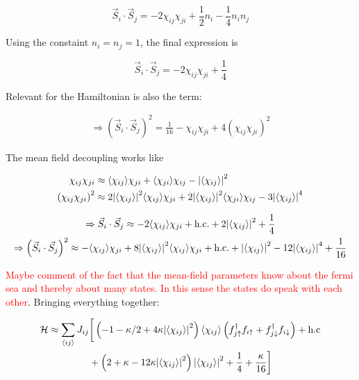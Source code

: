 \documentclass{article}
\begin{document}
\begin{equation}
	\vec{S}_i\cdot \vec{S}_j = -2\chi_{ij}\chi_{ji} + \frac12 n_i -\frac14 n_i n_j
\end{equation}

Using the constaint $n_i = n_j = 1$, the final expression is 

\begin{equation}
	\vec{S}_i\cdot \vec{S}_j = -2\chi_{ij}\chi_{ji} + \frac14
\end{equation}

Relevant for the Hamiltonian is also the term:

\begin{gather}
	\Rightarrow \left( \vec{S}_i \cdot \vec{S}_j \right)^2 =  \frac{1}{16}  - \chi_{ij} \chi_{ji} + 4\left(\chi_{ij}\chi_{ji}\right)^2
\end{gather}

The mean field decoupling works like 

\begin{align}
	\chi_{ij}\chi_{ji} &\approx \langle \chi_{ij} \rangle \chi_{ji} + \langle \chi_{ji} \rangle \chi_{ij} - \abs{\langle \chi_{ij}\rangle}^2 \\
	\left(\chi_{ij}\chi_{ji}\right)^2 &\approx 2\abs{\langle \chi_{ij}\rangle}^2\langle \chi_{ij} \rangle \chi_{ji} + 2\abs{ \langle \chi_{ij} \rangle}^2\langle \chi_{ji} \rangle \chi_{ij} - 3 \abs{\langle \chi_{ij}\rangle}^4
\end{align}


\begin{gather}
	\Rightarrow \vec{S}_i\cdot \vec{S}_j \approx -2\langle \chi_{ij} \rangle \chi_{ji} + \text{h.c.} + 2\abs{\langle \chi_{ij}\rangle}^2 + \frac14\\
	\Rightarrow \left( \vec{S}_i \cdot \vec{S}_j \right)^2 \approx -\langle \chi_{ij} \rangle \chi_{ji} + 8 \abs{\langle \chi_{ij} \rangle}^2\langle \chi_{ij} \rangle \chi_{ji} + \text{h.c.} + \abs{\langle \chi_{ij} \rangle}^2 - 12\abs{\langle \chi_{ij} \rangle}^4 + \frac{1}{16}
\end{gather}


\textcolor{red}{Maybe comment of the fact that the mean-field parameters know about the fermi sea and thereby about many states. In this sense the states do speak with each other}. Bringing everything together: 


\begin{align}
	\begin{split}
		\mathcal{H} \approx \sum_{\langle ij \rangle} J_{ij}&\bigg[ \left(-1 - \kappa/2 + 4 \kappa \abs{\langle \chi_{ij}\rangle}^2\right)\langle \chi_{ij} \rangle \left(f_{j\uparrow}^\dagger f_{i\uparrow} + f_{j\downarrow}^\dagger f_{i\downarrow}\right) + \text{h.c} \\
		&+ \left( 2 + \kappa - 12\kappa \abs{\langle \chi_{ij} \rangle}^2 \right) \abs{\langle \chi_{ij} \rangle}^2 + \frac{1}{4} + \frac{\kappa}{16}\bigg] 
	\end{split}
\end{align}
\end{document}
